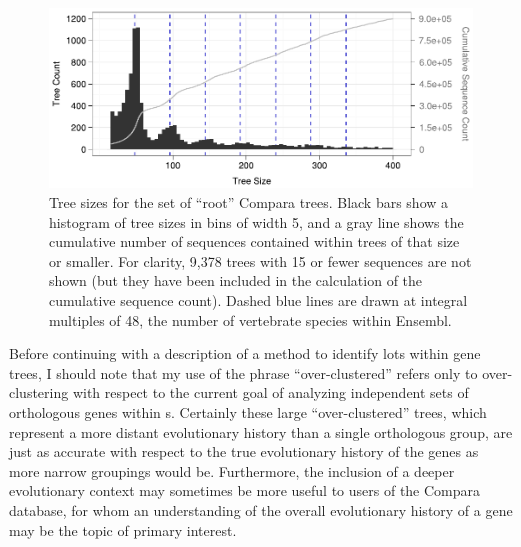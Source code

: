 \begin{figure}
\centering
\includegraphics[scale=0.9]{Figs/hist_ens_roots.pdf}
\caption{Tree sizes for the set of ``root'' Compara trees. Black bars
  show a histogram of tree sizes in bins of width 5, and a gray line
  shows the cumulative number of sequences contained within trees of
  that size or smaller. For clarity, 9,378 trees with 15 or fewer
  sequences are not shown (but they have been included in the
  calculation of the cumulative sequence count). Dashed blue lines are
  drawn at integral multiples of 48, the number of vertebrate species
  within Ensembl.}
\label{fig_ensembl_roots_hist}
\end{figure}


Before continuing with a description of a method to identify \acp{lot}
within \cmp gene trees, I should note that my use of the phrase
``over-clustered'' refers only to over-clustering with respect to the
current goal of analyzing independent sets of orthologous genes within
\mamml{}s. Certainly these large ``over-clustered'' trees, which
represent a more distant evolutionary history than a single \mammln
orthologous group, are just as accurate with respect to the true
evolutionary history of the genes as more narrow groupings would
be. Furthermore, the inclusion of a deeper evolutionary context may
sometimes be more useful to users of the Compara database, for whom an
understanding of the overall evolutionary history of a gene may be the
topic of primary interest.


